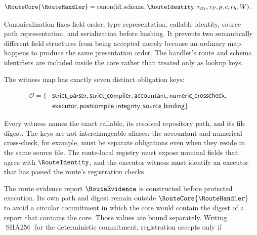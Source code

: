 \begin{equation}
    \RouteCore{\RouteHandler}
    =
    \operatorname{canon}\!\left(
        \mathrm{id},
        \mathrm{schema},
        \RouteIdentity,
        \tau_{\mathrm{ctr}},
        \tau_P,
        p,
        c,
        r_h,
        W
    \right).
\label{eq:ch3-complete-core}
\end{equation}

Canonicalization fixes field order, type representation, callable identity, source
path representation, and serialization before hashing.  It prevents two
semantically different field structures from being accepted merely because an
ordinary map happens to produce the same presentation order.  The handler's route
and schema identifiers are included inside the core rather than treated only as
lookup keys.

The witness map has exactly seven distinct obligation keys:

\begin{equation}
\begin{split}
    \mathcal O
    =\{&
        \textsf{strict\_parser},
        \textsf{strict\_compiler},
        \textsf{accountant},
        \textsf{numeric\_crosscheck},\\
      & \textsf{executor},
        \textsf{postcompile\_integrity},
        \textsf{source\_binding}
    \}.
\end{split}
\label{eq:ch3-obligation-set}
\end{equation}

Every witness names the exact callable, its resolved repository path, and its file
digest.  The keys are not interchangeable aliases: the accountant and numerical
cross-check, for example, must be separate obligations even when they reside in
the same source file.  The route-local registry must expose nominal fields that
agree with \(\RouteIdentity\), and the executor witness must identify an executor
that has passed the route's registration checks.

The route evidence report \(\RouteEvidence\) is constructed before protected
execution.  Its own path and digest remain outside
\(\RouteCore{\RouteHandler}\) to avoid a circular commitment in which the core
would contain the digest of a report that contains the core.  Those values are
bound separately.  Writing \(\operatorname{SHA256}\) for the deterministic
commitment, registration accepts only if

